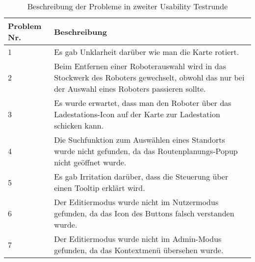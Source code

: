 \begin{table}[H]
    \caption{Beschreibung der Probleme in zweiter Usability Testrunde}\label{tbl:2ndUsabilityTestsProblemsDesc}
    \begin{tabular}{l|l}
        Problem Nr. & Beschreibung \\ \hline
        1           & \multicolumn{1}{p{12cm}}{Es gab Unklarheit darüber wie man die Karte rotiert.} \\ \hline
        2           & \multicolumn{1}{p{12cm}}{Beim Entfernen einer Roboterauswahl wird in das Stockwerk des Roboters gewechselt, obwohl das nur bei der Auswahl eines Roboters passieren sollte.} \\ \hline
        3           & \multicolumn{1}{p{12cm}}{Es wurde erwartet, dass man den Roboter über das Ladestations-Icon auf der Karte zur Ladestation schicken kann.} \\ \hline
        4           & \multicolumn{1}{p{12cm}}{Die Suchfunktion zum Auswählen eines Standorts wurde nicht gefunden, da das Routenplanungs-Popup nicht geöffnet wurde.} \\ \hline
        5           & \multicolumn{1}{p{12cm}}{Es gab Irritation darüber, dass die Steuerung über einen Tooltip erklärt wird.} \\ \hline
        6           & \multicolumn{1}{p{12cm}}{Der Editiermodus wurde nicht im Nutzermodus gefunden, da das Icon des Buttons falsch verstanden wurde.} \\ \hline
        7           & \multicolumn{1}{p{12cm}}{Der Editiermodus wurde nicht im Admin-Modus gefunden, da das Kontextmenü übersehen wurde.}
    \end{tabular}
\end{table}
